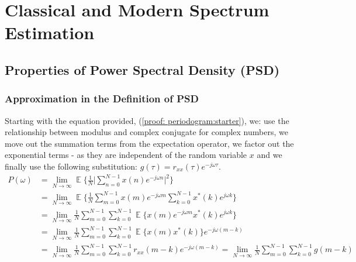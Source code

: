 \documentclass[12pt]{article}
\date{April 2019}
\DeclareMathOperator*{\E}{\mathbb{E}}
\begin{document}


\newpage
\setcounter{tocdepth}{2} %
\tableofcontents
\newpage
\section{Classical and Modern Spectrum Estimation} \label{sec: 1-CMSE}
	\subsection{Properties of Power Spectral Density (PSD)} \label{sec: 1-1-prop-PSD}
	
	\subsubsection{Approximation in the Definition of PSD} \label{sec: 1-1a-prop-PSD}
	Starting with the equation provided, (\ref{proof: periodogram:starter}), we: use the relationship between modulus and complex conjugate for complex numbers, we move out the summation terms from the expectation operator, we factor out the exponential terms - as they are independent of the random variable $x$ and we finally use the following substitution:  $g(\tau) = r_{xx}(\tau) e^{-j\omega\tau}$.
	\begin{align}
		P(\omega)   & =\lim_{N\to\infty} \E \bigg\{ \frac{1}{N} \bigg| \sum_{n=0}^{N-1} x(n) e^{-j\omega n} \bigg|^{2} \bigg\}
		\label{proof: periodogram:starter}\\
		& = \lim_{N\to\infty} \E \bigg\{\frac{1}{N}
		\sum_{m=0}^{N-1} x(m) e^{-j\omega m} \sum_{k=0}^{N-1} x^{*}(k) e^{j\omega k} \bigg\}\nonumber\\
		& = \lim_{N\to\infty} \frac{1}{N}
		\sum_{m=0}^{N-1} \sum_{k=0}^{N-1} \E \bigg\{ x(m) e^{-j\omega m} x^{*}(k) e^{j\omega k} \bigg\}\nonumber\\
		& = \lim_{N\to\infty} \frac{1}{N}
		\sum_{m=0}^{N-1} \sum_{k=0}^{N-1} \E \bigg\{ x(m) x^{*}(k) \bigg\} e^{-j\omega(m-k)} \nonumber\\
		& = \lim_{N\to\infty} \frac{1}{N}
		\sum_{m=0}^{N-1} \sum_{k=0}^{N-1} r_{xx}(m-k) e^{-j\omega(m-k)}
		= \lim_{N\to\infty} \frac{1}{N}
		\sum_{m=0}^{N-1} \sum_{k=0}^{N-1} g(m-k)
		\label{proof: periodogram}
	\end{align}
	
\end{document}
